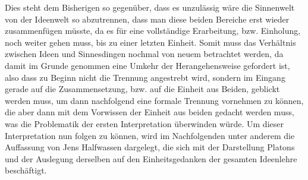 Dies steht dem Bisherigen so gegenüber, dass es unzulässig wäre die Sinnenwelt von der Ideenwelt so abzutrennen, dass man diese beiden Bereiche erst wieder zusammenfügen müsste, da es für eine vollständige Erarbeitung, bzw. Einholung, noch weiter gehen muss, bis zu einer letzten Einheit.
Somit muss das Verhältnis zwischen Ideen und Sinnesdingen nochmal von neuem betrachtet werden, da damit im Grunde genommen eine Umkehr der Herangehensweise gefordert ist, also dass zu Beginn nicht die Trennung angestrebt wird, sondern im Eingang gerade auf die Zusammensetzung, bzw. auf die Einheit aus Beiden, geblickt werden muss, um dann nachfolgend eine formale Trennung vornehmen zu können, die aber dann mit dem Vorwissen der Einheit aus beiden gedacht werden muss, was die Problematik der ersten Interpretation überwinden würde.
Um dieser Interpretation nun folgen zu können, wird im Nachfolgenden unter anderem die Auffassung von Jens Halfwassen dargelegt, die sich mit der Darstellung Platons und der Auslegung derselben auf den Einheitsgedanken der gesamten Ideenlehre beschäftigt.


